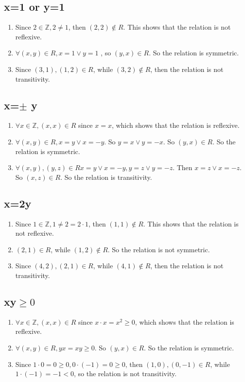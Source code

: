\documentclass[a4paper,12pt,titlepage]{article}
\begin{document}
\subsection{x=1 or y=1}
\begin{enumerate}
\item Since $2\in\mathbb{Z},2\neq1$, then $(2,2)\notin R$. This shows that the relation is not reflexive.
\item $\forall (x,y)\in R, x=1\vee y=1$ , so $(y,x)\in R$. So the relation is symmetric.
\item Since $(3,1),(1,2)\in R$, while $(3,2)\notin R$, then the relation is not transitivity.
\end{enumerate}

\subsection{x=$\pm$ y}
\begin{enumerate}
\item $\forall x\in\mathbb{Z}, (x,x)\in R$ since $x=x$, which shows that the relation is reflexive.
\item $\forall (x,y)\in R, x=y\vee x=-y$. So $y=x\vee y=-x$. So $(y,x)\in R$. So the relation is symmetric.
\item $\forall (x,y),(y,z)\in R x=y\vee x=-y, y=z\vee y=-z$. Then $x=z\vee x=-z$. So $(x,z)\in R$. So the relation is transitivity.
\end{enumerate}




\subsection{x=2y}
\begin{enumerate}
\item Since $1\in\mathbb{Z},1\neq2=2\cdot1$, then $(1,1)\notin R$. This shows that the relation is not reflexive.
\item $(2,1)\in R$, while $(1,2)\notin R$. So the relation is not symmetric.
\item Since $(4,2),(2,1)\in R$, while $(4,1)\notin R$, then the relation is not transitivity.
\end{enumerate}


\subsection{xy$\geqslant0$}
\begin{enumerate}
\item $\forall x\in\mathbb{Z}, (x,x)\in R$ since $x\cdot x=x^2\geqslant0$, which shows that the relation is reflexive.
\item $\forall (x,y)\in R, yx=xy\geqslant0$. So $(y,x)\in R$. So the relation is symmetric.
\item Since $1\cdot 0=0\geqslant0,0\cdot (-1)=0\geqslant0$, then $(1,0),(0,-1)\in R$, while $1\cdot(-1)=-1<0$,  so the relation is not transitivity.
\end{enumerate}
\end{document}
